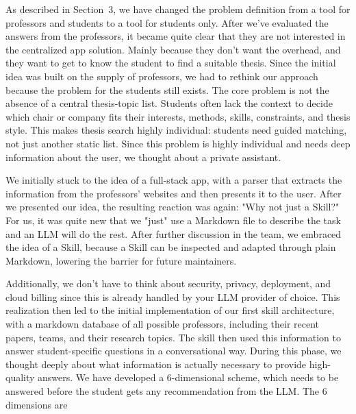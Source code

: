 \documentclass[11pt,a4paper]{article}
\begin{document}
\noindent As described in Section~3, we have changed the problem definition from a tool for professors and students to a tool for students only. After we've evaluated the answers from the professors, it became quite clear that they are not interested in the centralized app solution. Mainly because they don't want the overhead, and they want to get to know the student to find a suitable thesis.
Since the initial idea was built on the supply of professors, we had to rethink our approach because the problem for the students still exists. The core problem is not the absence of a central thesis-topic list. Students often lack the context to decide which chair or company fits their interests, methods, skills, constraints, and thesis style. This makes thesis search highly individual: students need guided matching, not just another static list. Since this problem is highly individual and needs deep information about the user, we thought about a private assistant.


\noindent We initially stuck to the idea of a full-stack app, with a parser that extracts the information from the professors' websites and then presents it to the user. After we presented our idea, the resulting reaction was again: "Why not just a Skill?" For us, it was quite new that we "just" use a Markdown file to describe the task and an LLM will do the rest. 
After further discussion in the team, we embraced the idea of a Skill, because a Skill can be inspected and adapted through plain Markdown, lowering the barrier for future maintainers.

\noindent Additionally, we don't have to think about security, privacy, deployment, and cloud billing since this is already handled by your LLM provider of choice. This realization then led to the initial 
implementation of our first skill architecture, with a markdown database of all possible professors, including their recent papers, teams, and their research topics. The skill then used this information to answer student-specific questions in a conversational way. 
During this phase, we thought deeply about what information is actually necessary to provide high-quality answers. We have developed a 6-dimensional scheme, which needs to be answered before the student gets any recommendation from the LLM. The 6 dimensions are
\end{document}
